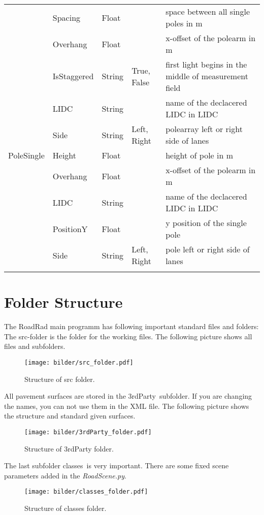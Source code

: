 \documentclass[10pt,a4paper]{report}
\newcommand{\mymidrule}{\specialrule{0.1em}{0em}{0em}}
\newcommand{\mybottomrule}{\specialrule{0.2em}{0em}{0em}}
\begin{document}
\begin{landscape}
\begin{longtable}{lllp{4cm}p{6cm}}
		 & Spacing & Float & & space between all single poles in m \\\rowcolor{hellgrau}
		 & Overhang & Float & & x-offset of the polearm in m \\\rowcolor{hellgrau}
		 & IsStaggered & String & True, False & first light begins in the middle of measurement field \\\rowcolor{hellgrau}
		 & LIDC & String & & name of the declacered LIDC in LIDC \\\rowcolor{hellgrau}
		 & Side & String & Left, Right & polearray left or right side of lanes \\
	\mymidrule
		PoleSingle & Height & Float & & height of pole in m \\
		 & Overhang & Float & & x-offset of the polearm in m \\
		 & LIDC & String & & name of the declacered LIDC in LIDC \\
		 & PositionY & Float & & y position of the single pole \\ 
		 & Side & String & Left, Right & pole left or right side of lanes \\
	\mybottomrule
	\end{longtable} 

\end{landscape}

\chapter{Folder Structure}
\label{chap:folder_struc}

The RoadRad main programm has following important standard files and folders:
The src-folder is the folder for the working files. The following picture shows all files and subfolders.
\begin{figure}[H]
\texttt{[image: bilder/src\_folder.pdf]} 
\caption{Structure of src folder.}
\end{figure}

All pavement surfaces are stored in the \glqq 3rdParty\grqq\ subfolder. If you are changing the names, you can not use them in the XML file. The following picture shows the structure and standard given surfaces.
\begin{figure}[H]
\texttt{[image: bilder/3rdParty\_folder.pdf]} 
\caption{Structure of 3rdParty folder.}
\end{figure}

The last subfolder \glqq classes\grqq\ is very important. There are some fixed scene parameters added in the \textit{RoadScene.py}.
\begin{figure}[H]
\texttt{[image: bilder/classes\_folder.pdf]} 
\caption{Structure of classes folder.}
\end{figure}
\end{document}
